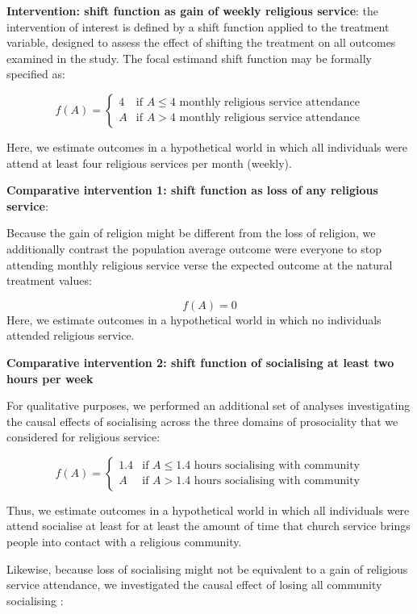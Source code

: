 \documentclass[
  singlecolumn]{article}
\begin{document}
\textbf{Intervention: shift function as gain of weekly religious
service}: the intervention of interest is defined by a shift function
applied to the treatment variable, designed to assess the effect of
shifting the treatment on all outcomes examined in the study. The focal
estimand shift function may be formally specified as:

\[f(A) = \begin{cases} 4 & \text{if } A \leq 4  \text{ monthly religious service attendance} \\ A & \text{if } A > 4  \text{ monthly religious service attendance} \end{cases} \]

Here, we estimate outcomes in a hypothetical world in which all
individuals were attend at least four religious services per month
(weekly).

\textbf{Comparative intervention 1: shift function as loss of any
religious service}:

Because the gain of religion might be different from the loss of
religion, we additionally contrast the population average outcome were
everyone to stop attending monthly religious service verse the expected
outcome at the natural treatment values:

\[f(A) = 0 \] Here, we estimate outcomes in a hypothetical world in
which no individuals attended religious service.

\textbf{Comparative intervention 2: shift function of socialising at
least two hours per week}

For qualitative purposes, we performed an additional set of analyses
investigating the causal effects of socialising across the three domains
of prosociality that we considered for religious service:

\[f(A) = \begin{cases} 1.4 & \text{if } A \leq 1.4 \text{ hours socialising with community} \\ A & \text{if } A >  1.4  \text{ hours socialising with community}  \end{cases} \]

Thus, we estimate outcomes in a hypothetical world in which all
individuals were attend socialise at least for at least the amount of
time that church service brings people into contact with a religious
community.

Likewise, because loss of socialising might not be equivalent to a gain
of religious service attendance, we investigated the causal effect of
losing all community socialising :
\end{document}
